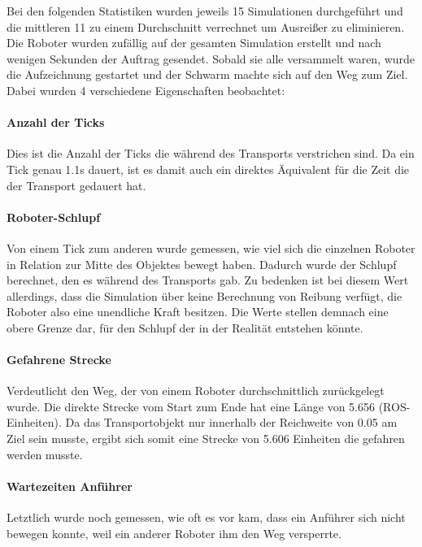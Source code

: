 Bei den folgenden Statistiken wurden jeweils 15 Simulationen durchgeführt und die mittleren 11 zu einem Durchschnitt verrechnet um Ausreißer zu eliminieren. Die Roboter wurden zufällig auf der gesamten Simulation erstellt und nach wenigen Sekunden der Auftrag gesendet. Sobald sie alle versammelt waren, wurde die Aufzeichnung gestartet und der Schwarm machte sich auf den Weg zum Ziel. Dabei wurden 4 verschiedene Eigenschaften beobachtet:

\paragraph*{Anzahl der Ticks}
Dies ist die Anzahl der Ticks die während des Transports verstrichen sind. Da ein Tick genau 1.1s dauert, ist es damit auch ein direktes Äquivalent für die Zeit die der Transport gedauert hat.

\paragraph*{Roboter-Schlupf}
Von einem Tick zum anderen wurde gemessen, wie viel sich die einzelnen Roboter in Relation zur Mitte des Objektes bewegt haben. Dadurch wurde der Schlupf berechnet, den es während des Transports gab. Zu bedenken ist bei diesem Wert allerdings, dass die Simulation über keine Berechnung von Reibung verfügt, die Roboter also eine unendliche Kraft besitzen. Die Werte stellen demnach eine obere Grenze dar, für den Schlupf der in der Realität entstehen könnte.

\paragraph*{Gefahrene Strecke}
Verdeutlicht den Weg, der von einem Roboter durchschnittlich zurückgelegt wurde. Die direkte Strecke vom Start zum Ende hat eine Länge von 5.656 (\ac{ROS}-Einheiten). Da das Transportobjekt nur innerhalb der Reichweite von 0.05 am Ziel sein musste, ergibt sich somit eine Strecke von 5.606 Einheiten die gefahren werden musste.

\paragraph*{Wartezeiten Anführer}
Letztlich wurde noch gemessen, wie oft es vor kam, dass ein Anführer sich nicht bewegen konnte, weil ein anderer Roboter ihm den Weg versperrte.

\newcommand{\sectionTransportPictureWidth}{7.5cm}

